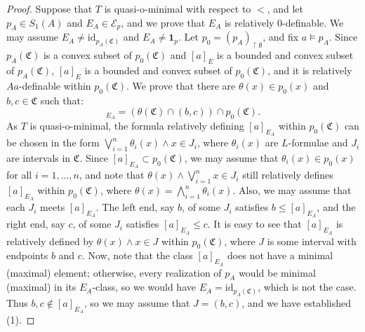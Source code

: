 \documentclass[10pt,a4paper]{amsart}
\def\strok{\restriction}
\newcommand{\Mon}{\mathfrak C}
\begin{document}
\begin{proof}
Suppose that $T$ is quasi-o-minimal with respect to $<$, and let $p_A\in S_1(A)$ and $E_A\in\mathcal E_p$, and we prove that $E_A$ is relatively 0-definable. We may assume $E_A\neq\mathrm{id}_{p_A(\Mon)}$ and $E_A\neq \mathbf 1_p$. 
Let $p_0=(p_A)_{\strok\emptyset}$, and fix $a\models p_A$.
Since $p_A(\Mon)$ is a convex subset of $p_0(\Mon)$ and $[a]_E$ is a bounded and convex subset of $p_A(\Mon)$, $[a]_E$ is a bounded and convex subset of $p_0(\Mon)$, and it is relatively $Aa$-definable within $p_0(\Mon)$. We prove that there are $\theta(x)\in p_0(x)$ and $b,c\in\Mon$ such that:
\setcounter{equation}{0}
\begin{equation}
[a]_{E_A}=(\theta(\Mon)\cap (b,c))\cap p_0(\Mon).
\end{equation}
As $T$ is quasi-o-minimal, the formula relatively defining $[a]_{E_A}$ within $p_0(\Mon)$ can be chosen in the form $\bigvee_{i=1}^n\theta_i(x)\land x\in J_i$, where $\theta_i(x)$ are $L$-formulae and $J_i$ are intervals in $\Mon$. Since $[a]_{E_A}\subset p_0(\Mon)$, we may assume that $\theta_i(x)\in p_0(x)$ for all $i=1,\dots,n$, and note that $\theta(x)\land\bigvee_{i=1}^nx\in J_i$ still relatively defines $[a]_{E_A}$ within $p_0(\Mon)$, where $\theta(x)=\bigwedge_{i=1}^n\theta_i(x)$. Also, we may assume that each $J_i$ meets $[a]_{E_A}$. The left end, say $b$, of some $J_i$ satisfies $b\leqslant[a]_{E_A}$, and the right end, say $c$, of some $J_i$ satisfies $[a]_{E_A}\leqslant c$. It is easy to see that $[a]_{E_A}$ is relatively defined by $\theta(x)\land x\in J$ within $p_0(\Mon)$, where $J$ is some interval with endpoints $b$ and $c$. 
Now, note that the class $[a]_{E_A}$ does not have a minimal (maximal) element; otherwise, every realization of $p_A$ would be minimal (maximal) in its $E_A$-class, so we would have $E_A=\mathrm{id}_{p_A(\Mon)}$, which is not the case. Thus $b,c\notin[a]_{E_A}$, so we may assume that $J=(b,c)$, and we have established (1). 


\end{proof}
\end{document}

